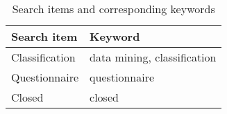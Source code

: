 

\begin{table}[h!]
  \begin{center}
    \caption{Search items and corresponding keywords}
    \label{tab:table1}
    \begin{tabular}{l|l} %
      \textbf{Search item} & \textbf{Keyword}            \\
      \hline
      Classification       & data mining, classification \\
      \hline
      Questionnaire        & questionnaire               \\
      \hline
      Closed               & closed                      \\
    \end{tabular}
  \end{center}
\end{table}

